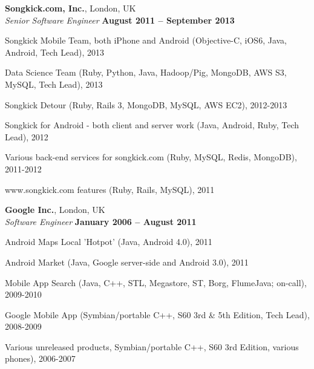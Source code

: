 \documentclass[line]{resume}
\begin{document}
\begin{resume}
    \pagebreak

    \textbf{Songkick.com, Inc.}, London, UK \vspace{2mm}\\\vspace{1mm}%
    \textsl{Senior Software Engineer} \hfill \textbf{August 2011 -- September 2013}\vspace{-3mm}\\\vspace{-1mm}%
    \begin{list2}
        \item Songkick Mobile Team, both iPhone and Android (Objective-C, iOS6, Java, Android, Tech Lead), 2013
        \item Data Science Team (Ruby, Python, Java, Hadoop/Pig, MongoDB, AWS S3, MySQL, Tech Lead), 2013
        \item Songkick Detour (Ruby, Rails 3, MongoDB, MySQL, AWS EC2), 2012-2013
        \item Songkick for Android - both client and server work (Java, Android, Ruby, Tech Lead), 2012
        \item Various back-end services for songkick.com (Ruby, MySQL, Redis, MongoDB), 2011-2012
        \item www.songkick.com features (Ruby, Rails, MySQL), 2011
    \end{list2}\vspace{-1.5mm}

    \textbf{Google Inc.}, London, UK \vspace{2mm}\\\vspace{1mm}%
    \textsl{Software Engineer} \hfill \textbf{January 2006 -- August 2011}\vspace{-3mm}\\\vspace{-1mm}%
    \begin{list2}
        \item Android Maps Local 'Hotpot' (Java,  Android 4.0), 2011
        \item Android Market (Java,  Google server-side and Android 3.0), 2011
        \item Mobile App Search (Java, C++, STL, Megastore, ST, Borg, FlumeJava; on-call), 2009-2010
        \item Google Mobile App (Symbian/portable C++, S60 3rd \& 5th Edition, Tech Lead), 2008-2009
        \item Various unreleased products, Symbian/portable C++, S60 3rd Edition, various phones), 2006-2007
    \end{list2}\vspace{-1.5mm}


\end{resume}
\end{document}
